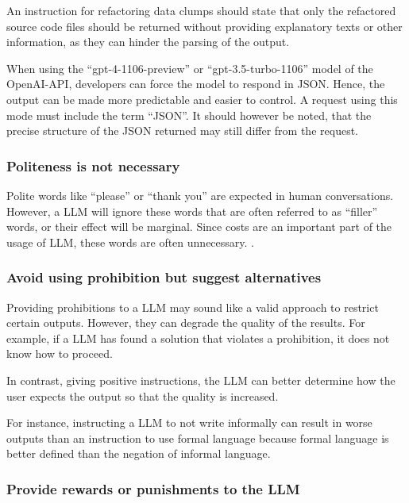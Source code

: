 An instruction for refactoring data clumps should state that only the refactored source code files should be returned without providing explanatory texts or other information, as they can hinder the parsing of the output. 

When using the \enquote{gpt-4-1106-preview} or \enquote{gpt-3.5-turbo-1106} model of the OpenAI-\ac{API}, developers can force the model to respond in \ac{JSON}. Hence, the output can be made more predictable and easier to control. A request using this mode must include the term \enquote{\ac{JSON}}. It should however be noted, that the precise structure of the \ac{JSON} returned may still differ from the request. 

\subsubsection{Politeness is not necessary}

Polite words like \enquote{please} or \enquote{thank you} are expected in human conversations. However, a  \ac{LLM} will ignore these words that are often referred to as \enquote{filler} words, or their effect will be marginal. Since costs are an important part of the usage of \ac{LLM}, these words are often unnecessary. \cite{bsharat2023principled}.

\subsubsection{Avoid using prohibition but suggest alternatives}

Providing prohibitions to a \ac{LLM} may sound like a valid approach to restrict certain outputs. However, they can degrade the quality of the results. For example, if a \ac{LLM} has found a solution that violates a prohibition, it does not know how to proceed. 

In contrast, giving positive instructions, the \ac{LLM} can better determine how the user expects the output so that the quality is increased.

For instance, instructing a \ac{LLM} to not write informally can result in worse outputs than an instruction to use formal language because formal language is better defined than the negation of informal language. \cite{prompt_engineering_jonathan}

\subsubsection{Provide rewards or punishments to the LLM}

